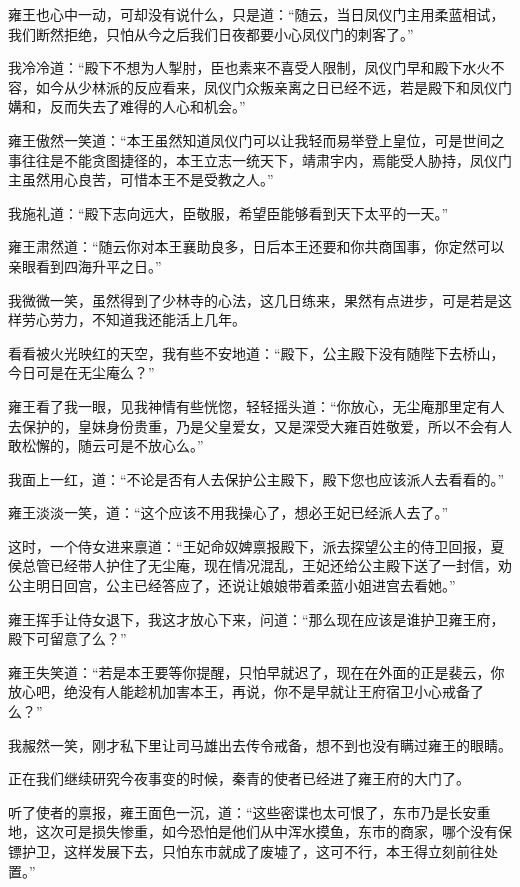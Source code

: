 雍王也心中一动，可却没有说什么，只是道：“随云，当日凤仪门主用柔蓝相试，我们断然拒绝，只怕从今之后我们日夜都要小心凤仪门的刺客了。”

我冷冷道：“殿下不想为人掣肘，臣也素来不喜受人限制，凤仪门早和殿下水火不容，如今从少林派的反应看来，凤仪门众叛亲离之日已经不远，若是殿下和凤仪门媾和，反而失去了难得的人心和机会。”

雍王傲然一笑道：“本王虽然知道凤仪门可以让我轻而易举登上皇位，可是世间之事往往是不能贪图捷径的，本王立志一统天下，靖肃宇内，焉能受人胁持，凤仪门主虽然用心良苦，可惜本王不是受教之人。”

我施礼道：“殿下志向远大，臣敬服，希望臣能够看到天下太平的一天。”

雍王肃然道：“随云你对本王襄助良多，日后本王还要和你共商国事，你定然可以亲眼看到四海升平之日。”

我微微一笑，虽然得到了少林寺的心法，这几日练来，果然有点进步，可是若是这样劳心劳力，不知道我还能活上几年。

看看被火光映红的天空，我有些不安地道：“殿下，公主殿下没有随陛下去桥山，今日可是在无尘庵么？”

雍王看了我一眼，见我神情有些恍惚，轻轻摇头道：“你放心，无尘庵那里定有人去保护的，皇妹身份贵重，乃是父皇爱女，又是深受大雍百姓敬爱，所以不会有人敢松懈的，随云可是不放心么。”

我面上一红，道：“不论是否有人去保护公主殿下，殿下您也应该派人去看看的。”

雍王淡淡一笑，道：“这个应该不用我操心了，想必王妃已经派人去了。”

这时，一个侍女进来禀道：“王妃命奴婢禀报殿下，派去探望公主的侍卫回报，夏侯总管已经带人护住了无尘庵，现在情况混乱，王妃还给公主殿下送了一封信，劝公主明日回宫，公主已经答应了，还说让娘娘带着柔蓝小姐进宫去看她。”

雍王挥手让侍女退下，我这才放心下来，问道：“那么现在应该是谁护卫雍王府，殿下可留意了么？”

雍王失笑道：“若是本王要等你提醒，只怕早就迟了，现在在外面的正是裴云，你放心吧，绝没有人能趁机加害本王，再说，你不是早就让王府宿卫小心戒备了么？”

我赧然一笑，刚才私下里让司马雄出去传令戒备，想不到也没有瞒过雍王的眼睛。

正在我们继续研究今夜事变的时候，秦青的使者已经进了雍王府的大门了。

听了使者的禀报，雍王面色一沉，道：“这些密谍也太可恨了，东市乃是长安重地，这次可是损失惨重，如今恐怕是他们从中浑水摸鱼，东市的商家，哪个没有保镖护卫，这样发展下去，只怕东市就成了废墟了，这可不行，本王得立刻前往处置。”

